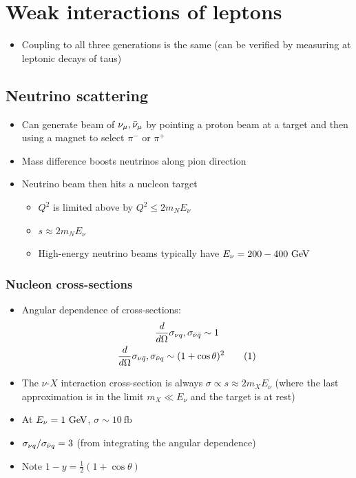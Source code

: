 \section{Weak interactions of leptons}
\begin{itemize}
  \item Coupling to all three generations is the same (can be verified by measuring at leptonic decays of taus)
\end{itemize}

\subsection{Neutrino scattering}
\begin{itemize}
  \item Can generate beam of $\nu_\mu,{\bar{\nu}}_\mu$ by pointing a proton beam at a target and then using a magnet to select $\pi^-$ or $\pi^+$ 
  \item Mass difference boosts neutrinos along pion direction
  \item Neutrino beam then hits a nucleon target
  \begin{itemize}
    \item $Q^2$ is limited above by $Q^2 \leq 2m_NE_\nu$
    \item $s \approx 2m_NE_\nu$
    \item High-energy neutrino beams typically have $E_\nu = 200-400~\text{GeV}$
  \end{itemize}
\end{itemize}
\subsubsection{Nucleon cross-sections}
\begin{itemize}
  \item Angular dependence of cross-sections:
  \begin{gather*}
    \dd{}{\Omega} \sigma_{\nu q},\sigma_{\nubar \qbar} \sim 1\\
    \dd{}{\Omega} \sigma_{\nu \qbar},\sigma_{\nubar q} \sim (1+\cos\theta)^2\numberthis
  \end{gather*}
  \item The $\nu$-$X$ interaction cross-section is always $\sigma\propto s \approx 2 m_X E_\nu$ (where the last approximation is in the limit $m_X\ll E_\nu$ and the target is at rest)
  \item At $E_\nu = 1~\text{GeV}$, $\sigma\sim 10~\text{fb}$
  \item $\sigma_{\nu q} /\sigma_{{\bar{\nu}} q} = 3$ (from integrating the angular dependence)
  \item Note $1-y = \frac{1}{2}(1+\cos\theta)$
\end{itemize}
